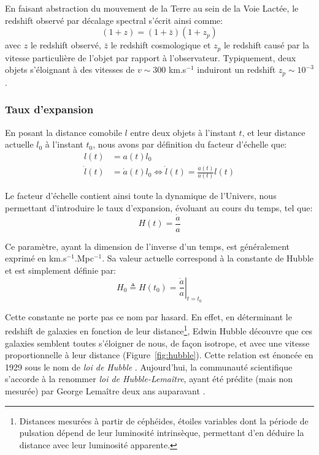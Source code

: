 \documentclass[../main/main.tex]{subfiles}
\begin{document}
En faisant abstraction du mouvement de la Terre au sein de la Voie
Lactée, le redshift observé par décalage spectral s'écrit ainsi comme:
\begin{equation}
  \label{eq:22}
  (1+z)=(1+\bar{z})(1+z_{p})
\end{equation}
avec $z$ le redshift observé, $\bar{z}$ le redshift cosmologique et
$z_{p}$ le redshift causé par la vitesse particulière de l’objet par
rapport à l’observateur. Typiquement, deux objets s'éloignant à des
vitesses de $v\sim300$ km.s$^{-1}$ induiront un redshift $z_{p}\sim10^{-3}$.

\subsubsection{Taux d'expansion}

En posant la distance comobile $l$ entre deux objets à l'instant $t$, et
leur distance actuelle $l_{0}$ à l'instant $t_{0}$, nous avons par
définition du facteur d'échelle que:
\begin{align*}
  l(t)&=a(t)l_{0}\\
  \dot{l}(t)&=\dot{a}(t)l_{0} \Leftrightarrow \dot{l}(t)=\frac{\dot{a}(t)}{a(t)}l(t)
\end{align*}

Le facteur d'échelle contient ainsi toute la dynamique de l'Univers,
nous permettant d'introduire le taux d'expansion, évoluant au cours du
temps, tel que:
\begin{equation}
  \label{eq:hubble}
  H(t)=\frac{\dot{a}}{a}
\end{equation}

Ce paramètre, ayant la dimension de l'inverse d'un temps, est
généralement exprimé en km.s$^{-1}$.Mpc$^{-1}$. Sa valeur actuelle
correspond à la constante de Hubble et est simplement définie par:
\begin{equation}
  \label{eq:hubbleconstante}
  H_{0}\triangleq H(t_{0}) = \left.\frac{\dot{a}}{a}\right\vert_{t=t_{0}}
\end{equation}

Cette constante ne porte pas ce nom par hasard. En effet, en déterminant
le redshift de galaxies en fonction de leur distance\footnote{Distances
  mesurées à partir de céphéides, étoiles variables dont la période de
  pulsation dépend de leur luminosité intrinsèque, permettant d'en
  déduire la distance avec leur luminosité apparente.}, Edwin Hubble
découvre que ces galaxies semblent toutes s'éloigner de nous, de façon
isotrope, et avec une vitesse proportionnelle à leur distance (Figure~\ref{fig:hubble}). Cette
relation est énoncée en 1929 sous le nom de \textit{loi de Hubble}
\citep{Hubble1929}. Aujourd'hui, la communauté scientifique s'accorde à
la renommer \textit{loi de Hubble-Lemaître}, ayant été prédite (mais non
mesurée) par George Lemaître deux ans auparavant
\citep{Lemaitre1927}.
\end{document}
